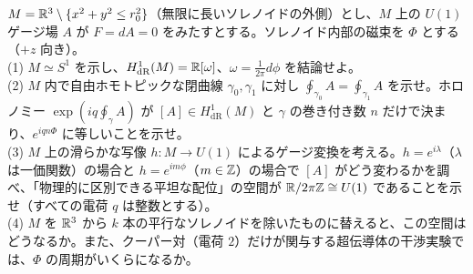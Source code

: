 \begin{problem}[難易度 C]\label{ch05-prob-holonomy}
$M=\mathbb{R}^3\setminus\{x^2+y^2\le r_0^2\}$（無限に長いソレノイドの外側）とし、$M$ 上の $U(1)$ ゲージ場 $A$ が $F=dA=0$ をみたすとする。ソレノイド内部の磁束を $\Phi$ とする（$+z$ 向き）。\\
(1) $M\simeq S^1$ を示し、$H^1_{\mathrm{dR}}(M)=\mathbb{R}[\omega]$、$\omega=\frac1{2\pi}d\phi$ を結論せよ。\\
(2) $M$ 内で自由ホモトピックな閉曲線 $\gamma_0,\gamma_1$ に対し $\oint_{\gamma_0}A=\oint_{\gamma_1}A$ を示せ。ホロノミー $\exp(iq\oint_\gamma A)$ が $[A]\in H^1_{\mathrm{dR}}(M)$ と $\gamma$ の巻き付き数 $n$ だけで決まり、$e^{iqn\Phi}$ に等しいことを示せ。\\
(3) $M$ 上の滑らかな写像 $h\colon M\to U(1)$ によるゲージ変換を考える。$h=e^{i\lambda}$（$\lambda$ は一価関数）の場合と $h=e^{im\phi}$（$m\in\mathbb{Z}$）の場合で $[A]$ がどう変わるかを調べ、「物理的に区別できる平坦な配位」の空間が $\mathbb{R}/2\pi\mathbb{Z}\cong U(1)$ であることを示せ（すべての電荷 $q$ は整数とする）。\\
(4) $M$ を $\mathbb{R}^3$ から $k$ 本の平行なソレノイドを除いたものに替えると、この空間はどうなるか。また、クーパー対（電荷 $2$）だけが関与する超伝導体の干渉実験では、$\Phi$ の周期がいくらになるか。
\end{problem}

